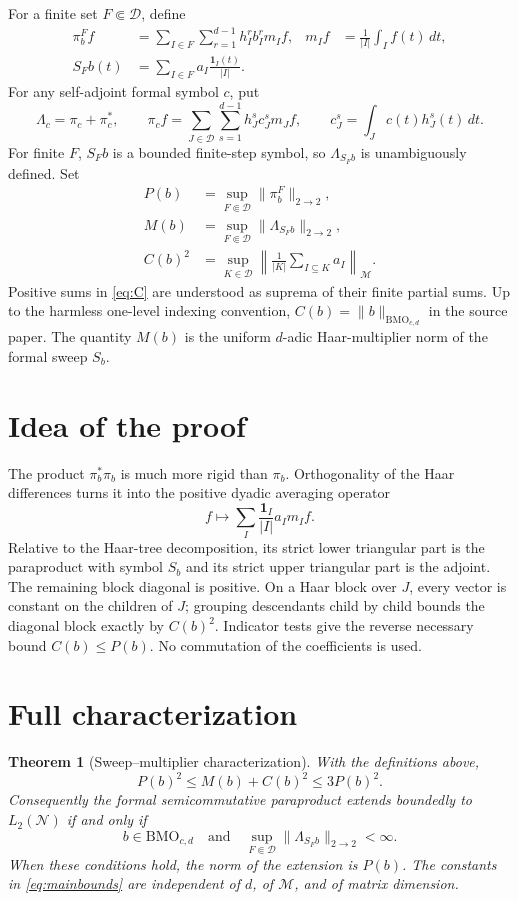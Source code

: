 \documentclass[11pt]{article}
\newtheorem{theorem}{Theorem}
\newcommand{\M}{\mathcal M}
\newcommand{\N}{\mathcal N}
\newcommand{\D}{\mathcal D}
\newcommand{\BMO}{\mathrm{BMO}}
\newcommand{\one}{\mathbf 1}
\begin{document}
For a finite set $F\Subset\D$, define
\begin{align*}
 \pi_b^F f
   &=\sum_{I\in F}\sum_{r=1}^{d-1}
       h_I^r b_I^r m_I f,
 &m_I f&=\frac1{|I|}\int_I f(t)\,dt,\\
 S_Fb(t)&=\sum_{I\in F}a_I\frac{\one_I(t)}{|I|}.
\end{align*}
For any self-adjoint formal symbol $c$, put
\[
 \Lambda_c=\pi_c+\pi_c^*,
 \qquad
 \pi_c f=\sum_{J\in\D}\sum_{s=1}^{d-1}
    h_J^s c_J^s m_Jf,
 \qquad c_J^s=\int_J c(t)h_J^s(t)\,dt.
\]
For finite $F$, $S_Fb$ is a bounded finite-step symbol, so
$\Lambda_{S_Fb}$ is unambiguously defined.  Set
\begin{align}
 P(b)&=\sup_{F\Subset\D}\|\pi_b^F\|_{2\to2},\label{eq:P}\\
 M(b)&=\sup_{F\Subset\D}\|\Lambda_{S_Fb}\|_{2\to2},\label{eq:M}\\
 C(b)^2&=\sup_{K\in\D}
 \left\|\frac1{|K|}\sum_{I\subseteq K}a_I\right\|_\M.
 \label{eq:C}
\end{align}
Positive sums in \eqref{eq:C} are understood as suprema of their finite
partial sums.  Up to the harmless one-level indexing convention,
$C(b)=\|b\|_{\BMO_{c,d}}$ in the source paper.  The quantity $M(b)$ is the
uniform $d$-adic Haar-multiplier norm of the formal sweep $S_b$.

\section{Idea of the proof}

The product $\pi_b^*\pi_b$ is much more rigid than $\pi_b$.  Orthogonality
of the Haar differences turns it into the positive dyadic averaging operator
\[
 f\longmapsto
 \sum_I\frac{\one_I}{|I|}a_I m_If.
\]
Relative to the Haar-tree decomposition, its strict lower triangular part is
the paraproduct with symbol $S_b$ and its strict upper triangular part is the
adjoint.  The remaining block diagonal is positive.  On a Haar block over
$J$, every vector is constant on the children of $J$; grouping descendants
child by child bounds the diagonal block exactly by $C(b)^2$.  Indicator
tests give the reverse necessary bound $C(b)\le P(b)$.  No commutation of the
coefficients is used.

\section{Full characterization}

\begin{theorem}[Sweep--multiplier characterization]\label{thm:main}
With the definitions above,
\begin{equation}\label{eq:mainbounds}
 P(b)^2\le M(b)+C(b)^2\le 3P(b)^2.
\end{equation}
Consequently the formal semicommutative paraproduct extends boundedly to
$L_2(\N)$ if and only if
\[
 b\in\BMO_{c,d}
 \quad\text{and}\quad
 \sup_{F\Subset\D}\|\Lambda_{S_Fb}\|_{2\to2}<\infty.
\]
When these conditions hold, the norm of the extension is $P(b)$.
The constants in \eqref{eq:mainbounds} are independent of $d$, of $\M$, and
of matrix dimension.
\end{theorem}
\end{document}
